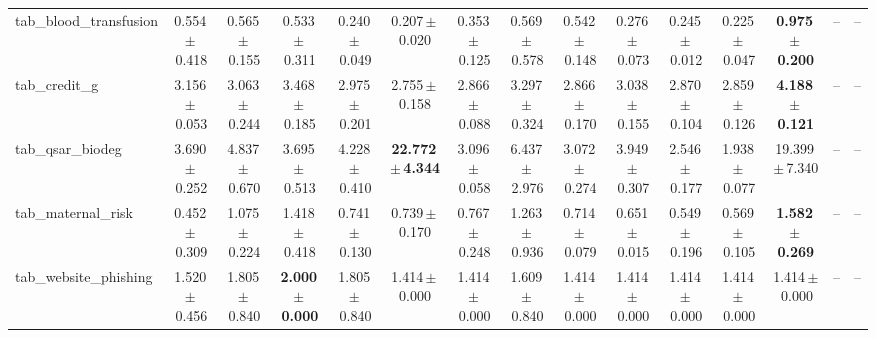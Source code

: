 \documentclass[8pt]{extarticle}
\begin{document}
\begin{longtable}{l*{14}{c}}
tab\_blood\_transfusion & 0.554\,$\pm$\,0.418 & 0.565\,$\pm$\,0.155 & 0.533\,$\pm$\,0.311 & 0.240\,$\pm$\,0.049 & 0.207\,$\pm$\,0.020 & 0.353\,$\pm$\,0.125 & 0.569\,$\pm$\,0.578 & 0.542\,$\pm$\,0.148 & 0.276\,$\pm$\,0.073 & 0.245\,$\pm$\,0.012 & 0.225\,$\pm$\,0.047 & \textbf{0.975\,$\pm$\,0.200} & -- & -- \\
tab\_credit\_g & 3.156\,$\pm$\,0.053 & 3.063\,$\pm$\,0.244 & 3.468\,$\pm$\,0.185 & 2.975\,$\pm$\,0.201 & 2.755\,$\pm$\,0.158 & 2.866\,$\pm$\,0.088 & 3.297\,$\pm$\,0.324 & 2.866\,$\pm$\,0.170 & 3.038\,$\pm$\,0.155 & 2.870\,$\pm$\,0.104 & 2.859\,$\pm$\,0.126 & \textbf{4.188\,$\pm$\,0.121} & -- & -- \\
tab\_qsar\_biodeg & 3.690\,$\pm$\,0.252 & 4.837\,$\pm$\,0.670 & 3.695\,$\pm$\,0.513 & 4.228\,$\pm$\,0.410 & \textbf{22.772\,$\pm$\,4.344} & 3.096\,$\pm$\,0.058 & 6.437\,$\pm$\,2.976 & 3.072\,$\pm$\,0.274 & 3.949\,$\pm$\,0.307 & 2.546\,$\pm$\,0.177 & 1.938\,$\pm$\,0.077 & 19.399\,$\pm$\,7.340 & -- & -- \\
tab\_maternal\_risk & 0.452\,$\pm$\,0.309 & 1.075\,$\pm$\,0.224 & 1.418\,$\pm$\,0.418 & 0.741\,$\pm$\,0.130 & 0.739\,$\pm$\,0.170 & 0.767\,$\pm$\,0.248 & 1.263\,$\pm$\,0.936 & 0.714\,$\pm$\,0.079 & 0.651\,$\pm$\,0.015 & 0.549\,$\pm$\,0.196 & 0.569\,$\pm$\,0.105 & \textbf{1.582\,$\pm$\,0.269} & -- & -- \\
tab\_website\_phishing & 1.520\,$\pm$\,0.456 & 1.805\,$\pm$\,0.840 & \textbf{2.000\,$\pm$\,0.000} & 1.805\,$\pm$\,0.840 & 1.414\,$\pm$\,0.000 & 1.414\,$\pm$\,0.000 & 1.609\,$\pm$\,0.840 & 1.414\,$\pm$\,0.000 & 1.414\,$\pm$\,0.000 & 1.414\,$\pm$\,0.000 & 1.414\,$\pm$\,0.000 & 1.414\,$\pm$\,0.000 & -- & -- \\
\end{longtable}
\end{document}
